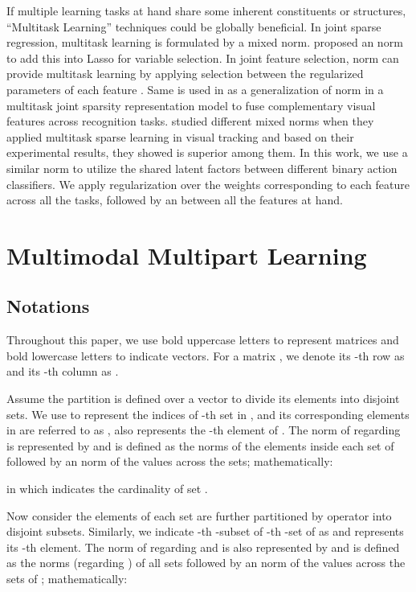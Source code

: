 \documentclass[9pt,technote,compsoc]{IEEEtran}
\begin{document}
If multiple learning tasks at hand share some inherent constituents or structures, ``Multitask Learning'' \cite{multitask1997} techniques could be globally beneficial. In joint sparse regression, multitask learning is formulated by a mixed norm. \cite{icml2009_LiuPZ09} proposed an  norm to add this into Lasso for variable selection. In joint feature selection,  norm can provide multitask learning by applying selection between the  regularized parameters of each feature \cite{obozinski2010joint}. Same is used in \cite{multitaskTIP} as a generalization of  norm in a multitask joint sparsity representation model to fuse complementary visual features across recognition tasks.\cite{6247908} studied different mixed norms when they applied multitask sparse learning in visual tracking and based on their experimental results, they showed  is superior among them. In this work, we use a similar norm to utilize the shared latent factors between different binary action classifiers. We apply  regularization over the weights corresponding to each feature across all the tasks, followed by an  between all the features at hand.


\section{Multimodal Multipart Learning}

\subsection*{Notations}

Throughout this paper, we use bold uppercase letters to represent matrices and bold lowercase letters to indicate vectors. For a matrix , we denote its -th row as  and its -th column as .

Assume the partition  is defined over a vector  to divide its elements into  disjoint sets. We use  to represent the indices of -th set in , and its corresponding elements in  are referred to as , also  represents the -th element of . The  norm of  regarding  is represented by  and is defined as the  norms of the elements inside each set of  followed by an  norm of the  values across the sets; mathematically:

in which  indicates the cardinality of set .

Now consider the elements of each set  are further partitioned by operator  into  disjoint subsets. Similarly, we indicate -th -subset of -th -set of  as  and  represents its -th element. The  norm of  regarding  and  is also represented by  and is defined as the  norms (regarding ) of all  sets followed by an  norm of the  values across the sets of ; mathematically:
\end{document}
